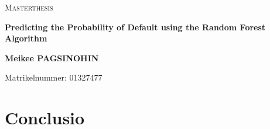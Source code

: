 \documentclass[11pt,twoside=true]{scrreprt}
\begin{document}

\begin{titlepage}
	\centering
	\vspace{1cm}
	{\scshape\LARGE Masterthesis \par}
	\vspace{1cm}
	{\scshape\Large \par}
	\vspace{1.5cm}
	{\huge\bfseries Predicting the Probability of Default using the Random Forest Algorithm \par}
	\vspace{2cm}
	\vspace{2cm}
	\vspace{2cm}
	{\Large\bfseries Meikee PAGSINOHIN \par}	
	\vfill
	{\Large Matrikelnummer: 01327477 \par}

	\vfill

\end{titlepage}



{} 
\pagestyle{scrheadings} 

\tableofcontents

















\chapter{Conclusio}



\newpage

\end{document}
